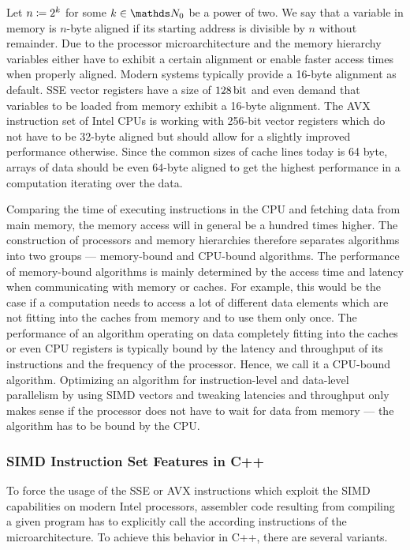 \documentclass{stdlocal}
\begin{document}
    Let $n \coloneqq 2^k$ for some $k\in\setNatural_0$ be a power of two.
    We say that a variable in memory is $n$-byte aligned if its starting address is divisible by $n$ without remainder.
    Due to the processor microarchitecture and the memory hierarchy variables either have to exhibit a certain alignment or enable faster access times when properly aligned.
    Modern systems typically provide a 16-byte alignment as default.
    SSE vector registers have a size of $128\, \mathrm{bit}$ and even demand that variables to be loaded from memory exhibit a 16-byte alignment.
    The AVX instruction set of Intel CPUs is working with 256-bit vector registers which do not have to be 32-byte aligned but should allow for a slightly improved performance otherwise.
    Since the common sizes of cache lines today is 64 byte, arrays of data should be even 64-byte aligned to get the highest performance in a computation iterating over the data.
    \autocite{fog2019a}

    Comparing the time of executing instructions in the CPU and fetching data from main memory, the memory access will in general be a hundred times higher.
    The construction of processors and memory hierarchies therefore separates algorithms into two groups --- memory-bound and CPU-bound algorithms.
    The performance of memory-bound algorithms is mainly determined by the access time and latency when communicating with memory or caches.
    For example, this would be the case if a computation needs to access a lot of different data elements which are not fitting into the caches from memory and to use them only once.
    The performance of an algorithm operating on data completely fitting into the caches or even CPU registers is typically bound by the latency and throughput of its instructions and the frequency of the processor.
    Hence, we call it a CPU-bound algorithm.
    Optimizing an algorithm for instruction-level and data-level parallelism by using SIMD vectors and tweaking latencies and throughput only makes sense if the processor does not have to wait for data from memory --- the algorithm has to be bound by the CPU.
    \autocite{patterson2014,hennessy2019}

  \subsubsection*{SIMD Instruction Set Features in C++} %
  \label{sub:usage_in_c_}
    To force the usage of the SSE or AVX instructions which exploit the SIMD capabilities on modern Intel processors, assembler code resulting from compiling a given program has to explicitly call the according instructions of the microarchitecture.
    To achieve this behavior in C++, there are several variants.
\end{document}

